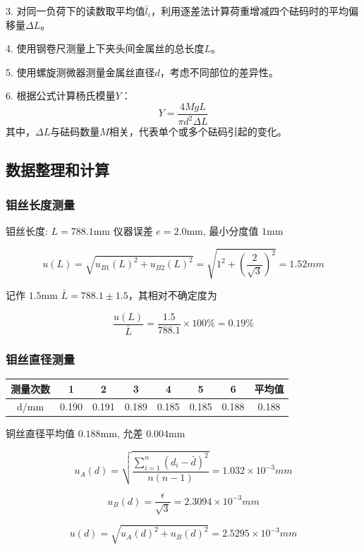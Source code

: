 \documentclass[zihao=5, UTF8]{article}
\theoremstyle{MyLineTheoremStyle} %
\theoremstyle{MyBlockTheoremStyle} %
\theoremstyle{MySubsubsectionStyle} %
\begin{document}
3. 对同一负荷下的读数取平均值$\bar{l}_i$，利用逐差法计算荷重增减四个砝码时的平均偏移量$\Delta L$。

4. 使用钢卷尺测量上下夹头间金属丝的总长度$L$。

5. 使用螺旋测微器测量金属丝直径$d$，考虑不同部位的差异性。

6. 根据公式计算杨氏模量$Y$：
   \[
   Y = \frac{4MgL}{\pi d^2 \Delta L}
   \]
   其中，$\Delta L$与砝码数量$M$相关，代表单个或多个砝码引起的变化。

\subsection{数据整理和计算}

\subsubsection{钼丝长度测量}
钼丝长度: $L = 788.1$mm 仪器误差 $e = 2.0$mm, 最小分度值 $1$mm

\[ u(L) = \sqrt{u_{B1}(L)^2 + u_{B2}(L)^2} = \sqrt{1^2 + \left(\frac{2}{\sqrt{3}}\right)^2} = 1.52 mm \]

记作 $1.5$mm $\bar{L} = 788.1 \pm 1.5 $，其相对不确定度为

\[ \frac{u(L)}{\bar{L}} = \frac{1.5}{788.1} \times 100 \% = 0.19 \% \]

\subsubsection{钼丝直径测量}

\begin{table}[htb]
    \centering
    \begin{tabular}{|c|c|c|c|c|c|c|c|}
        \hline
        测量次数 & 1 & 2 & 3 & 4 & 5 & 6 & 平均值 \\
        \hline
        d/mm & 0.190 & 0.191 & 0.189 & 0.185 & 0.185 & 0.188 & 0.188 \\
        \hline
    \end{tabular}
\end{table}

铜丝直径平均值 $0.188$mm, 允差 $0.004$mm

\[ u_A(d) = \sqrt{\frac{\sum_{i=1}^{n}(d_i-\bar{d})^2}{n(n-1)}} = 1.032 \times 10^{-3} mm \]

\[ u_B(d) = \frac{\epsilon}{\sqrt{3}} = 2.3094 \times 10^{-3} mm \]

\[ u(d) = \sqrt{u_A(d)^2 + u_B(d)^2} = 2.5295 \times 10^{-3} mm \]
\end{document}
